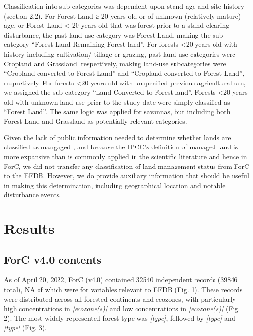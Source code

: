 \documentclass[, manuscript]{copernicus}
\begin{document}
Classification into sub-categories was dependent upon stand age and site
history (section 2.2). For Forest Land ≥ 20 years old or of unknown
(relatively mature) age, or Forest Land \textless{} 20 years old that
was forest prior to a stand-clearing disturbance, the past land-use
category was Forest Land, making the sub-category ``Forest Land
Remaining Forest land''. For forests \textless20 years old with history
including cultivation/ tillage or grazing, past land-use categories were
Cropland and Grassland, respectively, making land-use subcategories were
``Cropland converted to Forest Land'' and ``Cropland converted to Forest
Land'', respectively. For forests \textless20 years old with unspecified
previous agricultural use, we assigned the sub-category ``Land Converted
to Forest land''. Forests \textless20 years old with unknown land use
prior to the study date were simply classified as ``Forest Land''. The
same logic was applied for savannas, but including both Forest Land and
Grassland as potentially relevant categories.

Given the lack of public information needed to determine whether lands
are classified as mangaged
\citep{ogle_delineating_2018, deng_comparing_2021}, and because the
IPCC's definition of managed land is more expansive than is commonly
applied in the scientific literature and hence in ForC, we did not
transfer any classification of land management status from ForC to the
EFDB. However, we do provide auxiliary information that should be useful
in making this determination, including geographical location and
notable disturbance events.

\section{Results}

\subsection{ForC v4.0 contents}

As of April 20, 2022, ForC (v4.0) contained 32540 independent records
(39846 total), NA of which were for variables relevant to EFDB (Fig. 1).
These records were distributed across all forested continents and
ecozones, with particularly high concentrations in
\emph{{[}ecozone(s){]}} and low concentrations in
\emph{{[}ecozone(s){]}} (Fig. 2). The most widely represented forest
type was \emph{{[}type{]}}, followed by \emph{{[}type{]}} and
\emph{{[}type{]}} (Fig. 3).
\end{document}
